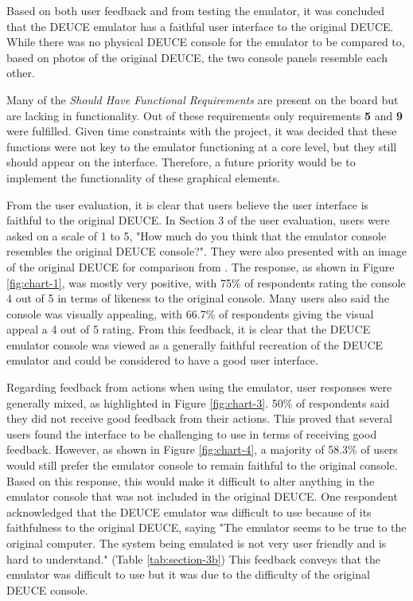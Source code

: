 \documentclass{l4proj}
\begin{document}
Based on both user feedback and from testing the emulator, it was concluded that the DEUCE emulator has a faithful user interface to the original DEUCE. While there was no physical DEUCE console for the emulator to be compared to, based on photos of the original DEUCE, the two console panels resemble each other. 

Many of the \textit{Should Have Functional Requirements} are present on the board but are lacking in functionality. Out of these requirements only requirements \textbf{5} and \textbf{9} were fulfilled. Given time constraints with the project, it was decided that these functions were not key to the emulator functioning at a core level, but they still should appear on the interface. Therefore, a future priority would be to implement the functionality of these graphical elements.

From the user evaluation, it is clear that users believe the user interface is faithful to the original DEUCE. In Section 3 of the user evaluation, users were asked on a scale of 1 to 5, "How much do you think that the emulator console resembles the original DEUCE console?". They were also presented with an image of the original DEUCE for comparison from \citet{chilton19}. The response, as shown in Figure \ref{fig:chart-1}, was mostly very positive, with 75\% of respondents rating the console 4 out of 5 in terms of likeness to the original console. Many users also said the console was visually appealing, with 66.7\% of respondents giving the visual appeal a 4 out of 5 rating. From this feedback, it is clear that the DEUCE emulator console was viewed as a generally faithful recreation of the DEUCE emulator and could be considered to have a good user interface.

Regarding feedback from actions when using the emulator, user responses were generally mixed, as highlighted in Figure \ref{fig:chart-3}. 50\% of respondents said they did not receive good feedback from their actions. This proved that several users found the interface to be challenging to use in terms of receiving good feedback. However, as shown in Figure \ref{fig:chart-4}, a majority of 58.3\% of users would still prefer the emulator console to remain faithful to the original console. Based on this response, this would make it difficult to alter anything in the emulator console that was not included in the original DEUCE. One respondent acknowledged that the DEUCE emulator was difficult to use because of its faithfulness to the original DEUCE, saying "The emulator seems to be true to the original computer. The system being emulated is not very user friendly and is hard to understand." (Table \ref{tab:section-3b}) This feedback conveys that the emulator was difficult to use but it was due to the difficulty of the original DEUCE console. 
\end{document}
